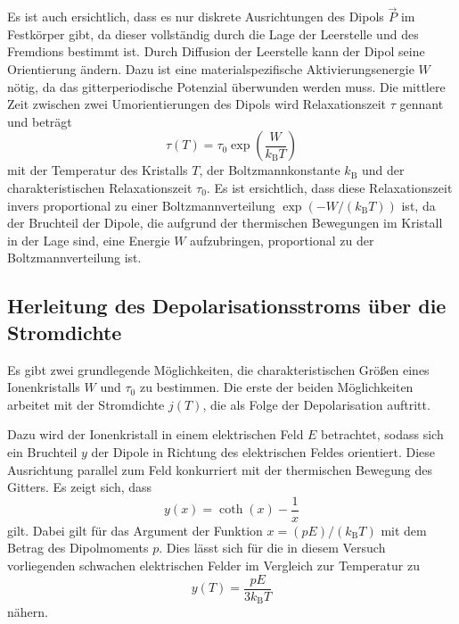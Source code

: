 Es ist auch ersichtlich, dass es nur diskrete Ausrichtungen des Dipols $\vec{P}$ im Festkörper gibt, da dieser vollständig durch die Lage der Leerstelle und des Fremdions bestimmt ist. Durch Diffusion der Leerstelle kann der Dipol seine Orientierung ändern. Dazu ist eine materialspezifische Aktivierungsenergie $W$ nötig, da das gitterperiodische Potenzial überwunden werden muss. Die mittlere Zeit zwischen zwei Umorientierungen des Dipols wird Relaxationszeit $\tau$ gennant und beträgt
\begin{equation}
  \tau(T) = \tau_0 \exp\left(\frac{W}{k_{\text{B}}T}\right)
  \label{eqn:relaxtime}
\end{equation}
mit der Temperatur des Kristalls $T$, der Boltzmannkonstante $k_{\text{B}}$ und der charakteristischen Relaxationszeit $\tau_0$. Es ist ersichtlich, dass diese Relaxationszeit invers proportional zu einer Boltzmannverteilung $\exp(-W/(k_\text{B}T))$ ist, da der Bruchteil der Dipole, die aufgrund der thermischen Bewegungen im Kristall in der Lage sind, eine Energie $W$ aufzubringen, proportional zu der Boltzmannverteilung ist.

\subsection{Herleitung des Depolarisationsstroms über die Stromdichte}
Es gibt zwei grundlegende Möglichkeiten, die charakteristischen Größen eines Ionenkristalls $W$ und $\tau_0$ zu bestimmen. Die erste der beiden Möglichkeiten arbeitet mit der Stromdichte $j(T)$, die als Folge der Depolarisation auftritt.

Dazu wird der Ionenkristall in einem elektrischen Feld $E$ betrachtet, sodass sich ein Bruchteil $y$ der Dipole in Richtung des elektrischen Feldes orientiert. Diese Ausrichtung parallel zum Feld konkurriert mit der thermischen Bewegung des Gitters. Es zeigt sich, dass
\begin{equation}
  y(x) = \coth(x) - \frac{1}{x}
  \label{eqn:langevin}
\end{equation}
gilt. Dabei gilt für das Argument der Funktion $x=(pE)/(k_\text{B}T)$ mit dem Betrag des Dipolmoments $p$.
Dies lässt sich für die in diesem Versuch vorliegenden schwachen elektrischen Felder im Vergleich zur Temperatur zu
\begin{equation}
  y(T) = \frac{pE}{3k_\text{B}T}
  \label{eqn:yApprox}
\end{equation}
nähern.

